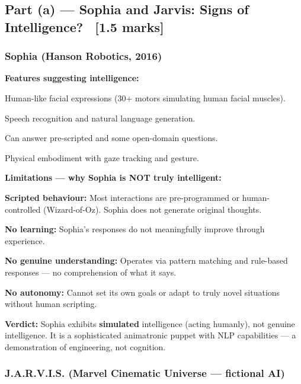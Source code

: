 \documentclass[12pt, a4paper]{article}
\begin{document}
\subsection{Part (a) — Sophia and Jarvis: Signs of Intelligence? \ [1.5 marks]}

\subsubsection*{Sophia (Hanson Robotics, 2016)}

\noindent\textbf{Features suggesting intelligence:}
\begin{keypoints}
  \item Human-like facial expressions (30+ motors simulating human facial muscles).
  \item Speech recognition and natural language generation.
  \item Can answer pre-scripted and some open-domain questions.
  \item Physical embodiment with gaze tracking and gesture.
\end{keypoints}

\noindent\textbf{Limitations — why Sophia is NOT truly intelligent:}
\begin{keypoints}
  \item \textbf{Scripted behaviour:} Most interactions are pre-programmed or human-controlled (Wizard-of-Oz). Sophia does not generate original thoughts.
  \item \textbf{No learning:} Sophia's responses do not meaningfully improve through experience.
  \item \textbf{No genuine understanding:} Operates via pattern matching and rule-based responses — no comprehension of what it says.
  \item \textbf{No autonomy:} Cannot set its own goals or adapt to truly novel situations without human scripting.
\end{keypoints}

\noindent\textbf{Verdict:} Sophia exhibits \textbf{simulated} intelligence (acting humanly), not genuine intelligence. It is a sophisticated animatronic puppet with NLP capabilities — a demonstration of engineering, not cognition.

\vspace{0.4em}

\subsubsection*{J.A.R.V.I.S. (Marvel Cinematic Universe — fictional AI)}
\end{document}
